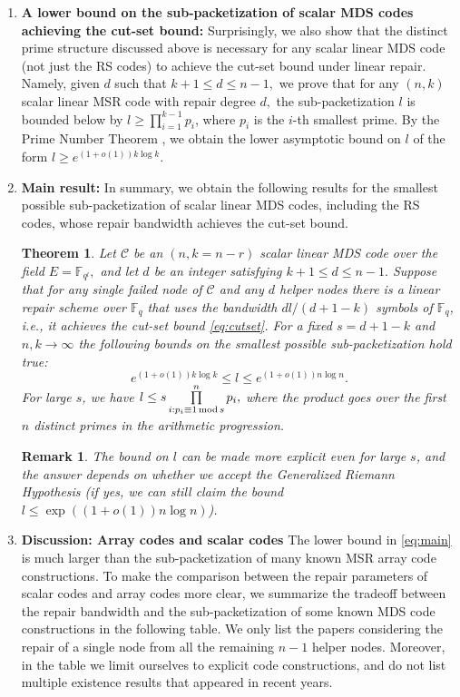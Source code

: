 \documentclass[11pt,onecolumn]{IEEEtran}
\newtheorem{theorem}{Theorem}
\newtheorem{remark}{Remark}
\newcommand{\ff}{{\mathbb F}}
\newcommand{\cC}{\mathcal{C}}
\begin{document}
\begin{enumerate}[(1)]
\vspace*{.1in}\item {\bf A lower bound on the sub-packetization of scalar MDS codes achieving the cut-set bound:} 
Surprisingly, we also show that the distinct prime structure discussed above is necessary for any scalar linear MDS code (not just the RS codes) to achieve the cut-set bound under linear repair. Namely, given $d$ such that $k+1\le d\le n-1,$ we prove that for any $(n,k)$ scalar linear MSR code with repair degree
$d,$ 
 the sub-packetization $l$ is bounded below by  $l \geq \prod_{i=1}^{k-1}p_i$, where $p_i$ is the $i$-th smallest prime.  By the Prime Number 
Theorem \cite{IK04}, we obtain the lower asymptotic bound on $l$ of the form
$
l\ge e^{(1+o(1))k \log k}.
$


\vspace*{.1in}\item{\bf Main result:}
In summary, we obtain the following results for the smallest possible sub-packetization of scalar linear MDS codes, including the RS codes, whose repair bandwidth 
achieves the cut-set bound.

\begin{theorem}\label{thm:main} Let $\cC$ be an $(n,k=n-r)$ scalar linear MDS code over the field $E=\ff_{q^l},$ 
and let $d$ be an integer satisfying $k+1\le d\le n-1.$ Suppose that for any single failed node of $\cC$ and any $d$ helper nodes there
is a linear repair scheme over $\ff_q$ that uses the bandwidth $dl/(d+1-k)$ symbols of $\ff_q$, i.e., it achieves the cut-set bound \eqref{eq:cutset}. For a fixed $s=d+1-k$ and $n,k\to\infty$ the following bounds on the smallest possible sub-packetization hold true:
  \begin{equation}\label{eq:main} 
  e^{(1+o(1))k \log k}\le l\le e^{(1+o(1)) n\log n}.%
  \end{equation}
For large $s$, we have $l\le 
s \prod\limits_{\substack{i: p_i\equiv 1\,\text{\rm mod}\, s}}^n p_i,$
where the product goes over the first $n$ distinct primes in the arithmetic progression.
\end{theorem}
\begin{remark} The bound on $l$ can be made more explicit 
even for large $s$, and the answer depends on whether we accept the Generalized Riemann Hypothesis (if yes, we can still claim the bound 
$l\le \exp((1+o(1))n\log n)$). \end{remark}

\item{\bf Discussion: Array codes and scalar codes} The lower bound in \eqref{eq:main} is 
much larger than the sub-packetization of many known MSR array code constructions.
To make the comparison between the repair parameters of scalar codes and array codes more clear, we summarize the tradeoff between the repair bandwidth and the sub-packetization of some known MDS code constructions in the following table.
We only list the papers considering the repair of a single node from all the remaining $n-1$ helper nodes. Moreover, in the table we limit ourselves to explicit code constructions, and do not list multiple existence results that appeared in recent years.


\end{enumerate}
\end{document}
